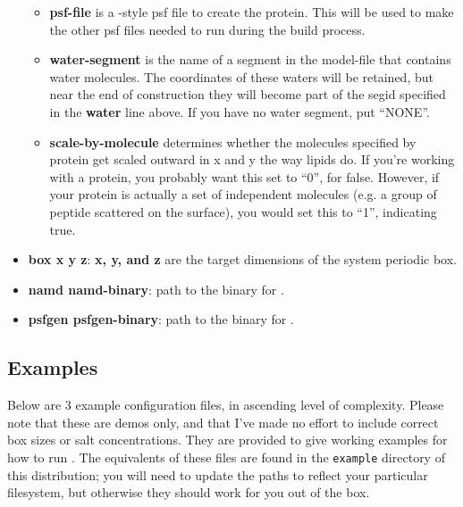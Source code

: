 \documentclass[12pt]{article}
\begin{document}
\begin{itemize}
\begin{itemize}
            \item {\bf psf-file} is a \namd-style psf file to create the
            protein.  This will be used to make the other psf files needed
        to run {\namd} during the build process.  \item {\bf water-segment}
            is the name of a segment in the model-file that contains water
            molecules.  The coordinates of these waters will be retained,
            but near the end of construction they will become part of the
            segid specified in the {\bf water} line above.  If you have no
            water segment, put ``NONE''.
            
            \item{\bf scale-by-molecule} determines whether the molecules
                specified by protein get scaled outward in x and y the way
                lipids do.  If you're working with a protein, you probably
                want this set to ``0'', for false.  However, if your
                protein is actually a set of independent molecules (e.g. a
                group of peptide scattered on the surface), you would set
                this to ``1'', indicating true.

          \end{itemize}
     \item {\bf box x y z}: {\bf x, y, and z} are the target dimensions of the
            system periodic box.  
     \item {\bf namd namd-binary}: path to the binary for \namd.
     \item {\bf psfgen psfgen-binary}: path to the binary for \psfgen.

\end{itemize}

\subsection{Examples}
\label{ss:examples}

Below are 3 example configuration files, in ascending level of complexity.
Please note that these are demos only, and that I've made no effort to
include correct box sizes or salt concentrations.  They are provided to
give working examples for how to run \omgwtf.  The equivalents of these
files are found in the {\tt example} directory of this distribution; you
will need to update the paths to reflect your particular filesystem, but
otherwise they should work for you out of the box.
\end{document}
